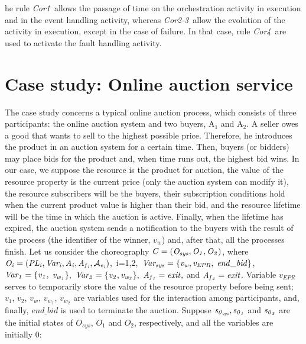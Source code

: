 he rule {\it Cor1}\ allows the passage of time on the
orchestration activity in execution and in the event handling activity, whereas
{\it Cor2-3}\, allow the evolution of the activity in execution,
except in the case of failure. In that case, rule {\it Cor4}\,
are used to activate the fault handling activity.


\section{Case study: Online auction service}\label{cs}
The case study concerns a typical online auction process, which consists of three participants:
the online auction system and two buyers, A$_1$ and A$_2$. A seller owes a good that wants to sell to the highest possible price. Therefore, he introduces the product
in an auction system for a certain time. Then, buyers (or bidders) may place bids for the product and, when time runs out, the highest bid wins. In our case, we suppose the resource is the product for auction, the value of the resource property is the current price (only the auction system can modify it), the resource subscribers will be the buyers, their subscription conditions hold when the current product value is higher than their bid, and the resource lifetime will be the time in which the auction is active. Finally, when the lifetime has expired, the auction system sends a notification to the buyers with the result of the process (the identifier of the winner, $v_w$) and, after that, all the processes finish. Let us consider the choreography ${\it C=(O_{sys},O_1,O_2)}$, where
${\it O_i=(PL_i,Var_i,A_i,A_{f{_i}},\mathcal{A}_{e{_i}})}$,~i=1,2,~${\it Var_{sys}=\{v_w,v_{EPR},}$
${\it end\_bid\}}$,~${\it Var_1=\{v_1,}$ ${\it v_{w{_1}}\},\ Var_2=\{v_2,v_{w_{2}}\},\ A_{f{_1}}=exit,}$ and
${\it A_{f{_2}}=exit}$. Variable $v_{EPR}$ serves to temporarily store the value of the resource property before being sent; $v_1$, $v_2$, $v_{w_{}}$, $v_{w_{1}}$, $v_{w_{2}}$ are variables used for the interaction among participants, and, finally, $end\_bid$ is used to terminate the auction. Suppose ${\it s_{0{_{sys}}}, s_{0{_1}}}$ and ${\it s_{0{_2}}}$ are the initial states of $O_{sys}$, $O_1$ and $O_2$, respectively, and all the variables are initially $0$: \\[-0.2cm]

\vspace{-0.201cm}

\small

